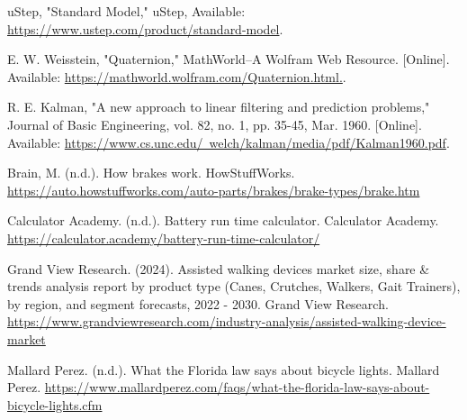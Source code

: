 \begin{thebibliography}{45}
	 uStep, "Standard Model," uStep, Available: \href{https://www.ustep.com/product/standard-model}{https://www.ustep.com/product/standard-model}.
	
	 E. W. Weisstein, "Quaternion," MathWorld--A Wolfram Web Resource. [Online]. Available: \href{https://mathworld.wolfram.com/Quaternion.html.}{https://mathworld.wolfram.com/Quaternion.html.}.
	
	 R. E. Kalman, "A new approach to linear filtering and prediction problems," Journal of Basic Engineering, vol. 82, no. 1, pp. 35-45, Mar. 1960. [Online]. Available: \href{https://www.cs.unc.edu/~welch/kalman/media/pdf/Kalman1960.pdf}{https://www.cs.unc.edu/~welch/kalman/media/pdf/Kalman1960.pdf}.
	
	 Brain, M. (n.d.). How brakes work. HowStuffWorks. \href{https://auto.howstuffworks.com/auto-parts/brakes/brake-types/brake.htm}{https://auto.howstuffworks.com/auto-parts/brakes/brake-types/brake.htm}
	
	 Calculator Academy. (n.d.). Battery run time calculator. Calculator Academy. \href{https://calculator.academy/battery-run-time-calculator/}{https://calculator.academy/battery-run-time-calculator/}
	
	 Grand View Research. (2024). Assisted walking devices market size, share \& trends analysis report by product type (Canes, Crutches, Walkers, Gait Trainers), by region, and segment forecasts, 2022 - 2030. Grand View Research. \href{https://www.grandviewresearch.com/industry-analysis/assisted-walking-device-market}{https://www.grandviewresearch.com/industry-analysis/assisted-walking-device-market}
	
	 Mallard Perez. (n.d.). What the Florida law says about bicycle lights. Mallard Perez. \href{https://www.mallardperez.com/faqs/what-the-florida-law-says-about-bicycle-lights.cfm}{https://www.mallardperez.com/faqs/what-the-florida-law-says-about-bicycle-lights.cfm}
	
\end{thebibliography}
